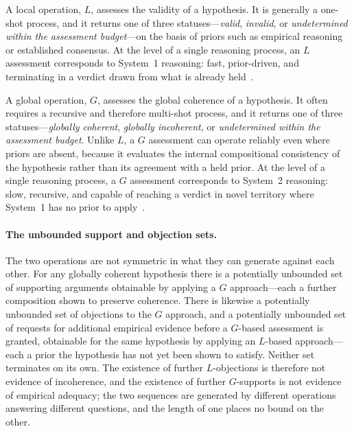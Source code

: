 \documentclass[10pt,twoside,a5paper]{article}
\theoremstyle{definition}
\begin{document}
A local operation, $L$, assesses the validity of a hypothesis. It is generally a
one-shot process, and it returns one of three statuses---\emph{valid},
\emph{invalid}, or \emph{undetermined within the assessment budget}---on the basis of
priors such as empirical reasoning or established consensus. At the level of a single
reasoning process, an $L$ assessment corresponds to System~1 reasoning: fast,
prior-driven, and terminating in a verdict drawn from what is already
held~\cite{Kahneman2011}.

A global operation, $G$, assesses the global coherence of a hypothesis. It often
requires a recursive and therefore multi-shot process, and it returns one of three
statuses---\emph{globally coherent}, \emph{globally incoherent}, or
\emph{undetermined within the assessment budget}. Unlike $L$, a $G$ assessment can
operate reliably even where priors are absent, because it evaluates the internal
compositional consistency of the hypothesis rather than its agreement with a held
prior. At the level of a single reasoning process, a $G$ assessment corresponds to
System~2 reasoning: slow, recursive, and capable of reaching a verdict in novel
territory where System~1 has no prior to apply~\cite{Kahneman2011}.

\paragraph{The unbounded support and objection sets.}
The two operations are not symmetric in what they can generate against each other. For
any globally coherent hypothesis there is a potentially unbounded set of supporting
arguments obtainable by applying a $G$ approach---each a further composition shown to
preserve coherence. There is likewise a potentially unbounded set of objections to the
$G$ approach, and a potentially unbounded set of requests for additional empirical
evidence before a $G$-based assessment is granted, obtainable for the same hypothesis
by applying an $L$-based approach---each a prior the hypothesis has not yet been shown
to satisfy. Neither set terminates on its own. The existence of further $L$-objections
is therefore not evidence of incoherence, and the existence of further $G$-supports is
not evidence of empirical adequacy; the two sequences are generated by different
operations answering different questions, and the length of one places no bound on the
other.
\end{document}

